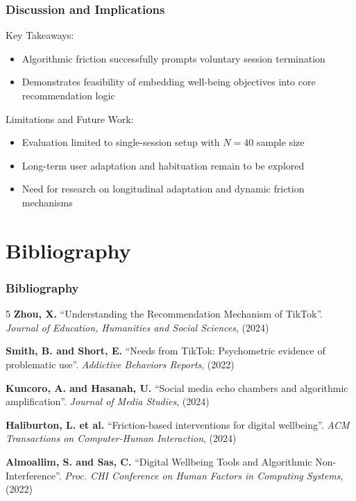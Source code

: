 \documentclass{beamer}
\begin{document}
	\begin{frame}
		\frametitle{Discussion and Implications}
		Key Takeaways:
		\begin{itemize}
			\item Algorithmic friction successfully prompts voluntary session termination
			\item Demonstrates feasibility of embedding well-being objectives into core recommendation logic
		\end{itemize}
		
		Limitations and Future Work:
		\begin{itemize}
			\item Evaluation limited to single-session setup with $N = 40$ sample size
			\item Long-term user adaptation and habituation remain to be explored
			\item Need for research on longitudinal adaptation and dynamic friction mechanisms
		\end{itemize}
	\end{frame}
	
	\section*{Bibliography}
	
	\begin{frame}
		\frametitle{Bibliography}
		\begin{thebibliography}{5}
			 \textbf{Zhou, X.} “Understanding the Recommendation Mechanism of TikTok”. \textit{Journal of Education, Humanities and Social Sciences}, (2024)
			
			 \textbf{Smith, B. and Short, E.} “Needs from TikTok: Psychometric evidence of problematic use”. \textit{Addictive Behaviors Reports}, (2022)
			
			 \textbf{Kuncoro, A. and Hasanah, U.} “Social media echo chambers and algorithmic amplification”. \textit{Journal of Media Studies}, (2024)
			
			 \textbf{Haliburton, L. et al.} “Friction-based interventions for digital wellbeing”. \textit{ACM Transactions on Computer-Human Interaction}, (2024)
			
			 \textbf{Almoallim, S. and Sas, C.} “Digital Wellbeing Tools and Algorithmic Non-Interference”. \textit{Proc. CHI Conference on Human Factors in Computing Systems}, (2022)
		\end{thebibliography}
	\end{frame}
	
\end{document}
